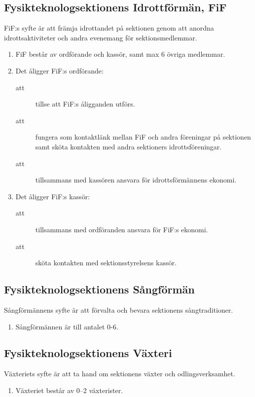 \documentclass[11pt,a4paper]{article}
\begin{document}
\subsection{Fysikteknologsektionens Idrottförmän, FiF}
FiF:s syfte är att främja idrottandet på sektionen genom att anordna idrottsaktiviteter och andra evenemang för sektionsmedlemmar.
\begin{enumerate}[\thesubsection .1]

  \item FiF består av ordförande och kassör, samt max 6 övriga
  medlemmar.

  \item Det åligger FiF:s ordförande:
    \begin{description}
      \item[att] tillse att FiF:s åligganden utförs.
      \item[att] fungera som kontaktlänk mellan FiF och andra
      föreningar på sektionen samt sköta kontakten med andra
      sektioners idrotts\-före\-ning\-ar.
      \item[att] tillsammans med kassören ansvara för idrottsförmännens ekonomi.
    \end{description}

  \item Det åligger FiF:s kassör:
    \begin{description}
      \item[att] tillsammans med ordföranden ansvara för FiF:s ekonomi.
      \item[att] sköta kontakten med sektionsstyrelsens kassör.
    \end{description}

\end{enumerate}

\subsection{Fysikteknologsektionens Sångförmän}
Sångförmännens syfte är att förvalta och bevara sektionens sångtraditioner.
\begin{enumerate}[\thesubsection .1]

  \item Sångförmännen är till antalet 0-6.

\end{enumerate}

\subsection{Fysikteknologsektionens Växteri}
Växteriets syfte är att ta hand om sektionens växter och odlingsverksamhet.
\begin{enumerate}[\thesubsection .1]

  \item Växteriet består av 0--2 växterister.

\end{enumerate}
\end{document}
